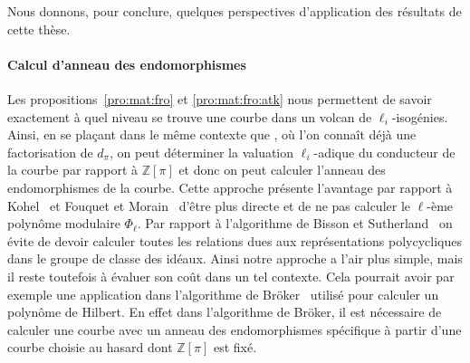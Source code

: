 \documentclass[10pt,a4paper]{book}
\theoremstyle{plain}
\theoremstyle{definition}
\theoremstyle{definition}
\theoremstyle{definition}
\theoremstyle{definition}
\theoremstyle{definition}
\theoremstyle{remark}
\theoremstyle{remark}
\theoremstyle{definition}
\begin{document}
Nous donnons, pour conclure, quelques perspectives d'application des
résultats de cette thèse.

\paragraph{Calcul d'anneau des endomorphismes}
Les propositions~\ref{pro:mat:fro} et \ref{pro:mat:fro:atk} nous 
permettent de savoir exactement à quel niveau se trouve une courbe dans un 
volcan de $\ell_i$-isogénies. Ainsi, en se plaçant dans le même contexte que 
\cite{Kohel96,BissonSutherland11}, où l'on connaît déjà une factorisation de 
$d_{\pi}$, on peut déterminer la valuation $\ell_i$-adique du conducteur de la 
courbe par rapport à $\mathbb{Z}[\pi]$ et donc on peut calculer l'anneau des 
endomorphismes de la courbe.  %
Cette approche présente l'avantage par rapport à Kohel~\cite{Kohel96} et 
Fouquet et Morain~\cite{FouquetMorain02} d'être plus directe et de ne pas 
calculer le $\ell$-ème polynôme modulaire $\Phi_{\ell}$. Par rapport à 
l'algorithme de Bisson et Sutherland~\cite{BissonSutherland11} on évite de 
devoir calculer toutes les relations dues aux représentations polycycliques 
dans le groupe de classe des idéaux. Ainsi notre approche a l'air plus simple, 
mais il reste toutefois à évaluer son coût dans un tel contexte.
Cela pourrait avoir par exemple une application dans l'algorithme de
Bröker~\cite{Broker08} utilisé pour calculer un polynôme de Hilbert. En effet 
dans l'algorithme de Bröker, il est nécessaire de calculer une courbe avec un 
anneau des endomorphismes spécifique à partir d'une courbe choisie au hasard dont 
$\mathbb{Z}[\pi]$ est fixé.
\end{document}
